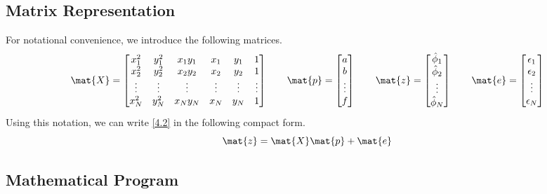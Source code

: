 \documentclass[12pt]{article}
\begin{document}
\subsection{Matrix Representation}
For notational convenience, we introduce the following matrices.
%
\begin{equation}\label{4.3}
    \mat{X} =
    \begin{bmatrix}
        x_1^2  & y_1^2  & x_1y_1 & x_1    & y_1    & 1 \\
        x_2^2  & y_2^2  & x_2y_2 & x_2    & y_2    & 1 \\
        \vdots & \vdots & \vdots & \vdots & \vdots & \vdots \\
        x_N^2  & y_N^2  & x_Ny_N & x_N    & y_N    & 1
    \end{bmatrix}
    \qquad
    \mat{p} =
    \begin{bmatrix}
        a \\
        b \\
        \vdots \\
        f
    \end{bmatrix}
    \qquad
    \mat{z} =
    \begin{bmatrix}
        \hat{\phi}_1 \\
        \hat{\phi}_2 \\
        \vdots \\
        \hat{\phi}_N \\
    \end{bmatrix}
    \qquad
    \mat{e} =
    \begin{bmatrix}
        \epsilon_1 \\
        \epsilon_2 \\
        \vdots \\
        \epsilon_N \\
    \end{bmatrix}
\end{equation}
%
Using this notation, we can write \eqref{4.2} in the following compact form.
%
\begin{equation}\label{4.4}
    \mat{z} = \mat{X} \mat{p} + \mat{e}
\end{equation}

\subsection{Mathematical Program}
\end{document}
